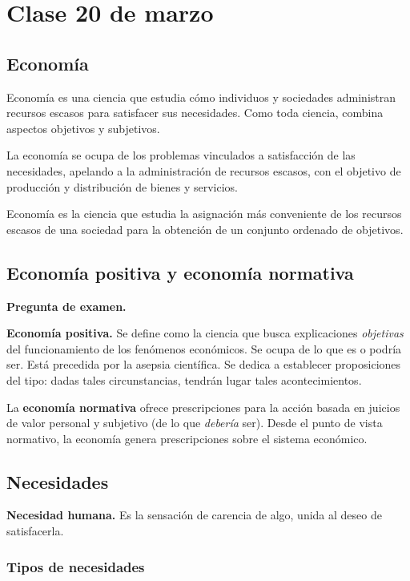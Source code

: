\section{Clase 20 de marzo}

\subsection{Economía}

Economía es una ciencia que estudia cómo individuos y sociedades administran recursos escasos 
para satisfacer sus necesidades.
Como toda ciencia,
combina aspectos objetivos y subjetivos.

La economía se ocupa de los problemas vinculados a satisfacción de las necesidades,
apelando a la administración de recursos escasos,
con el objetivo de producción y distribución de bienes y servicios.

Economía es la ciencia que estudia la asignación más conveniente 
de los recursos escasos de una sociedad 
para la obtención de un conjunto ordenado de objetivos.

\subsection{Economía positiva y economía normativa}

\textbf{Pregunta de examen.}

\textbf{Economía positiva.}
Se define como
la ciencia que busca explicaciones \textit{objetivas} del funcionamiento de los fenómenos económicos.
Se ocupa de lo que es o podría ser.
Está precedida por la asepsia científica.
Se dedica a establecer proposiciones del tipo:
dadas tales circunstancias,
tendrán lugar tales acontecimientos.

La \textbf{economía normativa} ofrece prescripciones para la acción
basada en juicios de valor personal y subjetivo
(de lo que \textit{debería} ser).
Desde el punto de vista normativo, 
la economía genera prescripciones
sobre el sistema económico.

\subsection{Necesidades}

\textbf{Necesidad humana.}
Es la sensación de carencia de algo,
unida al deseo de satisfacerla.

\subsubsection{Tipos de necesidades}

